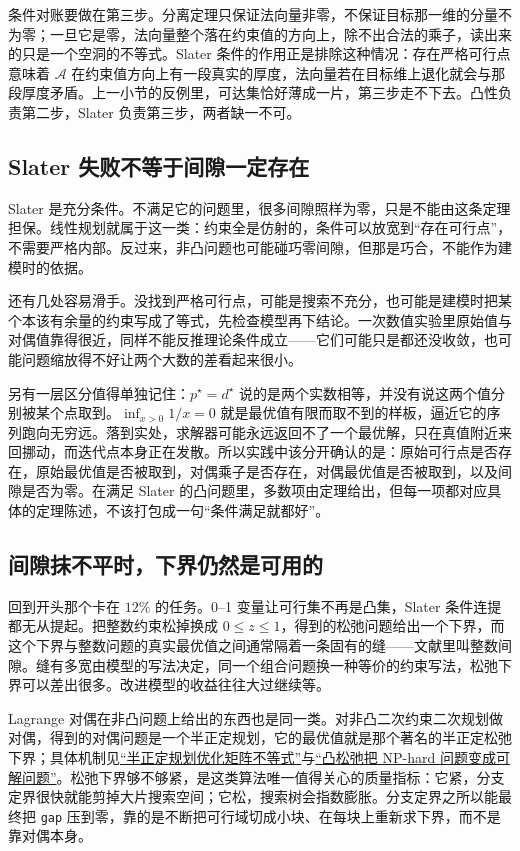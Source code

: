 条件对账要做在第三步。分离定理只保证法向量非零，不保证目标那一维的分量不为零；一旦它是零，法向量整个落在约束值的方向上，除不出合法的乘子，读出来的只是一个空洞的不等式。Slater 条件的作用正是排除这种情况：存在严格可行点意味着 \(\mathcal{A}\) 在约束值方向上有一段真实的厚度，法向量若在目标维上退化就会与那段厚度矛盾。上一小节的反例里，可达集恰好薄成一片，第三步走不下去。凸性负责第二步，Slater 负责第三步，两者缺一不可。

\subsection{Slater 失败不等于间隙一定存在}

Slater 是充分条件。不满足它的问题里，很多间隙照样为零，只是不能由这条定理担保。线性规划就属于这一类：约束全是仿射的，条件可以放宽到``存在可行点''，不需要严格内部。反过来，非凸问题也可能碰巧零间隙，但那是巧合，不能作为建模时的依据。

还有几处容易滑手。没找到严格可行点，可能是搜索不充分，也可能是建模时把某个本该有余量的约束写成了等式，先检查模型再下结论。一次数值实验里原始值与对偶值靠得很近，同样不能反推理论条件成立——它们可能只是都还没收敛，也可能问题缩放得不好让两个大数的差看起来很小。

另有一层区分值得单独记住：\(p^\star=d^\star\) 说的是两个实数相等，并没有说这两个值分别被某个点取到。\(\inf_{x>0}1/x=0\) 就是最优值有限而取不到的样板，逼近它的序列跑向无穷远。落到实处，求解器可能永远返回不了一个最优解，只在真值附近来回挪动，而迭代点本身正在发散。所以实践中该分开确认的是：原始可行点是否存在，原始最优值是否被取到，对偶乘子是否存在，对偶最优值是否被取到，以及间隙是否为零。在满足 Slater 的凸问题里，多数项由定理给出，但每一项都对应具体的定理陈述，不该打包成一句``条件满足就都好''。

\subsection{间隙抹不平时，下界仍然是可用的}

回到开头那个卡在 \(12\%\) 的任务。0--1 变量让可行集不再是凸集，Slater 条件连提都无从提起。把整数约束松掉换成 \(0\le z\le1\)，得到的松弛问题给出一个下界，而这个下界与整数问题的真实最优值之间通常隔着一条固有的缝——文献里叫整数间隙。缝有多宽由模型的写法决定，同一个组合问题换一种等价的约束写法，松弛下界可以差出很多。改进模型的收益往往大过继续等。

Lagrange 对偶在非凸问题上给出的东西也是同一类。对非凸二次约束二次规划做对偶，得到的对偶问题是一个半正定规划，它的最优值就是那个著名的半正定松弛下界；具体机制见\hyperref[sec:09-Convex-Optimization/04-Convex-Problems/04]{``半正定规划优化矩阵不等式''}与\hyperref[sec:09-Convex-Optimization/09-Complexity-and-Approximation/02]{``凸松弛把 NP-hard 问题变成可解问题''}。松弛下界够不够紧，是这类算法唯一值得关心的质量指标：它紧，分支定界很快就能剪掉大片搜索空间；它松，搜索树会指数膨胀。分支定界之所以能最终把 \texttt{gap} 压到零，靠的是不断把可行域切成小块、在每块上重新求下界，而不是靠对偶本身。

